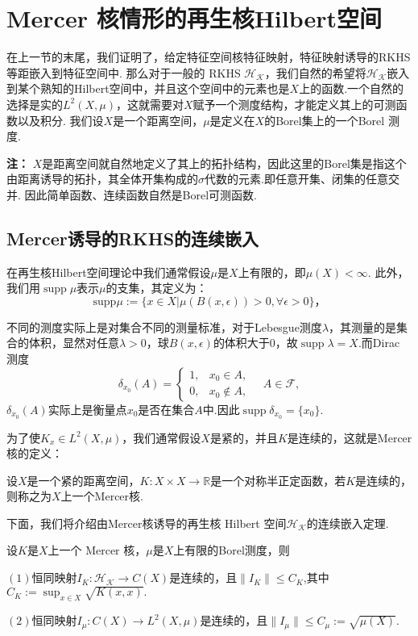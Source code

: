 \documentclass[../master.tex]{subfiles}
\begin{document}
\section{Mercer 核情形的再生核Hilbert空间}

在上一节的末尾，我们证明了，给定特征空间核特征映射，特征映射诱导的RKHS等距嵌入到特征空间中. 那么对于一般的
RKHS $\mathcal{H_K}$，我们自然的希望将$\mathcal{H_K}$嵌入到某个熟知的Hilbert空间中，并且这个空间中的元素也是$X$上的函数.一个自然的选择是实的$L^2(X,\mu)$，这就需要对$X$赋予一个测度结构，才能定义其上的可测函数以及积分. 我们设$X$是一个距离空间，$\mu$是定义在$X$的Borel集上的一个Borel 测度.

\textbf{注：} $X$是距离空间就自然地定义了其上的拓扑结构，因此这里的Borel集是指这个由距离诱导的拓扑，其全体开集构成的$\sigma$代数的元素.即任意开集、闭集的任意交并. 因此简单函数、连续函数自然是Borel可测函数.


\subsection{Mercer诱导的RKHS的连续嵌入}
在再生核Hilbert空间理论中我们通常假设$\mu$是$X$上有限的，即$\mu(X)<\infty$. 此外，我们用$\operatorname{supp} \mu$表示$\mu$的支集，其定义为：
\begin{equation*}
    \mathrm{supp}\mu:=\{x\in X|\mu(B(x,\epsilon))>0,\forall\epsilon>0\}，
\end{equation*}

不同的测度实际上是对集合不同的测量标准，对于Lebesgue测度$\lambda$，其测量的是集合的体积，显然对任意$\lambda>0$，球$B(x,\epsilon)$的体积大于0，故$\operatorname{supp}\lambda=X$.而Dirac 测度
$$\delta_{x_0}(A) = \begin{cases}
1, & x_0 \in A, \\
0, & x_0 \notin A,
\end{cases} \quad A \in \mathcal{F},$$
$\delta_{x_0}(A)$实际上是衡量点$x_0$是否在集合$A$中.因此$\operatorname{supp}\delta_{x_0}=\{x_0\}.$


为了使$K_x\in L^2(X,\mu)$，我们通常假设$X$是紧的，并且$K$是连续的，这就是Mercer核的定义：
\begin{definition}[Mercer核]
    设$X$是一个紧的距离空间，$K:X\times X\to\mathbb{R}$是一个对称半正定函数，若$K$是连续的，则称之为$X$上一个Mercer核.
\end{definition}


下面，我们将介绍由Mercer核诱导的再生核 Hilbert 空间$\mathcal{H_K}$的连续嵌入定理.
\begin{theorem}
    设$K$是$X$上一个 Mercer 核，$\mu$是$X$上有限的Borel测度，则
    
$(1)$恒同映射$I_K:\mathcal{H_K}\to C(X)$是连续的，且$\|I_K\|\leq C_K$,其中$C_K:=\sup_{x\in X}\sqrt{K(x,x)}.$

$(2)$恒同映射$I_\mu:C(X)\to L^2(X,\mu)$是连续的，且$\|I_\mu\|\leq C_\mu:=\sqrt{\mu(X)}.$
\end{theorem}
\end{document}
